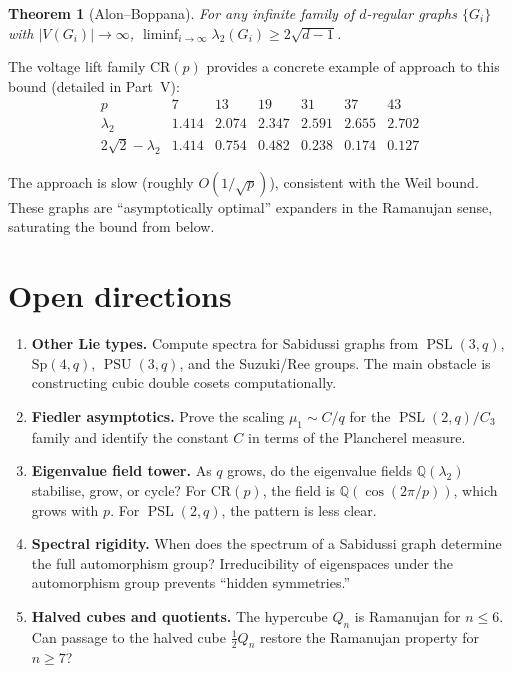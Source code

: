 \documentclass[11pt,a4paper]{article}
\theoremstyle{plain}
\newtheorem{theorem}{Theorem}[section]
\theoremstyle{definition}
\theoremstyle{remark}
\newcommand{\Q}{\mathbb{Q}}
\newcommand{\PSL}{\operatorname{PSL}}
\newcommand{\PSU}{\operatorname{PSU}}
\newcommand{\CR}{\mathrm{CR}}
\begin{document}
\begin{tcolorbox}[colback=black!5, colframe=black!5,
  boxrule=0pt, sharp corners]
\begin{theorem}[Alon--Boppana]
For any infinite family of $d$-regular graphs $\{G_i\}$ with
$|V(G_i)| \to \infty$,
$\liminf_{i\to\infty} \lambda_2(G_i) \ge 2\sqrt{d-1}$.
\end{theorem}
\end{tcolorbox}

The voltage lift family $\CR(p)$ provides a concrete example of
approach to this bound (detailed in Part~V):
\[
\begin{array}{c|cccccc}
p & 7 & 13 & 19 & 31 & 37 & 43 \\
\hline
\lambda_2 & 1.414 & 2.074 & 2.347 & 2.591 & 2.655 & 2.702 \\
2\sqrt{2} - \lambda_2 & 1.414 & 0.754 & 0.482 & 0.238 & 0.174 & 0.127
\end{array}
\]

The approach is slow (roughly $O(1/\sqrt{p})$), consistent with the Weil
bound. These graphs are ``asymptotically optimal'' expanders in the
Ramanujan sense, saturating the bound from below.


\section{Open directions}

\begin{tcolorbox}[breakable, colback=blue!5, colframe=blue!5,
  boxrule=0pt, sharp corners]
\begin{enumerate}[noitemsep]
\item \textbf{Other Lie types.} Compute spectra for Sabidussi graphs from
  $\PSL(3,q)$, $\mathrm{Sp}(4,q)$, $\PSU(3,q)$, and the Suzuki/Ree
  groups. The main obstacle is constructing cubic double cosets
  computationally.

\item \textbf{Fiedler asymptotics.} Prove the scaling
  $\mu_1 \sim C/q$ for the $\PSL(2,q)/C_3$ family and identify the
  constant $C$ in terms of the Plancherel measure.

\item \textbf{Eigenvalue field tower.} As $q$ grows, do the eigenvalue
  fields $\Q(\lambda_2)$ stabilise, grow, or cycle? For
  $\CR(p)$, the field is $\Q(\cos(2\pi/p))$, which
  grows with $p$. For $\PSL(2,q)$, the pattern is less clear.

\item \textbf{Spectral rigidity.} When does the spectrum of a Sabidussi
  graph determine the full automorphism group? Irreducibility of
  eigenspaces under the automorphism group prevents ``hidden symmetries.''

\item \textbf{Halved cubes and quotients.} The hypercube $Q_n$ is Ramanujan
  for $n \le 6$. Can passage to the halved cube $\tfrac{1}{2}Q_n$ restore
  the Ramanujan property for $n \ge 7$?
\end{enumerate}
\end{tcolorbox}
\end{document}
